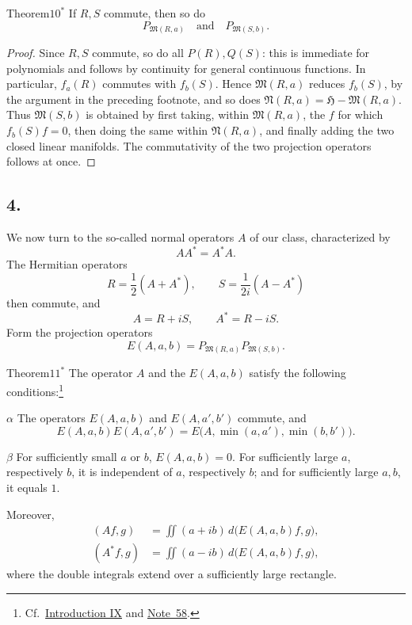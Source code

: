 ﻿\documentclass[paper=b5,fontsize=13pt,bookmarkpackage=false,twoside]{scrartcl}
\begin{document}
\begin{namedstatement}{Theorem}{\(10^*\)}
\label{thm:appII-10}
If \(R,S\) commute, then so do
\[
  P_{\mathfrak M(R,a)}
  \quad\text{and}\quad
  P_{\mathfrak M(S,b)}.
\]
\end{namedstatement}

\begin{proof}
Since \(R,S\) commute, so do all \(P(R),Q(S)\): this is immediate for
polynomials and follows by continuity for general continuous functions.
In particular, \(f_a(R)\) commutes with \(f_b(S)\).  Hence
\(\mathfrak M(R,a)\) reduces \(f_b(S)\), by the argument in the preceding
footnote, and so does
\(\mathfrak N(R,a)=\mathfrak H-\mathfrak M(R,a)\).
Thus \(\mathfrak M(S,b)\) is obtained by first taking, within
\(\mathfrak M(R,a)\), the \(f\) for which \(f_b(S)f=0\), then doing the
same within \(\mathfrak N(R,a)\), and finally adding the two closed
linear manifolds.  The commutativity of the two projection operators
follows at once.
\end{proof}

\subsection*{4.}
\label{appII:4}

We now turn to the so-called normal operators \(A\) of our class,
characterized by
\[
  AA^*=A^*A.
\]
The Hermitian operators
\[
  R=\frac12(A+A^*),\qquad
  S=\frac1{2i}(A-A^*)
\]
then commute, and
\[
  A=R+iS,\qquad A^*=R-iS.
\]
Form the projection operators
\[
  E(A,a,b)
  =P_{\mathfrak M(R,a)}P_{\mathfrak M(S,b)}.
\]

\begin{namedstatement}{Theorem}{\(11^*\)}
\label{thm:appII-11}
The operator \(A\) and the \(E(A,a,b)\) satisfy the following
conditions:\footnote{\label{fn:68}Cf.\ \hyperref[intro:IX]{Introduction IX} and
\hyperref[fn:58]{Note~58}.}

\(\alpha\) The operators \(E(A,a,b)\) and \(E(A,a',b')\) commute, and
\[
  E(A,a,b)E(A,a',b')
  =E\bigl(A,\min(a,a'),\min(b,b')\bigr).
\]

\(\beta\) For sufficiently small \(a\) or \(b\),
\(E(A,a,b)=0\).  For sufficiently large \(a\), respectively \(b\), it
is independent of \(a\), respectively \(b\); and for sufficiently
large \(a,b\), it equals \(1\).

Moreover,
\begin{align*}
  (Af,g)&=\iint(a+ib)\,d\bigl(E(A,a,b)f,g\bigr),\\
  (A^*f,g)&=\iint(a-ib)\,d\bigl(E(A,a,b)f,g\bigr),
\end{align*}
where the double integrals extend over a sufficiently large rectangle.
\end{namedstatement}
\end{document}
